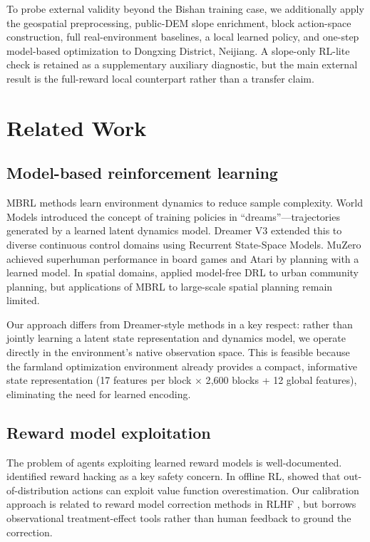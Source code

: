 \documentclass[11pt]{article}
\begin{document}
To probe external validity beyond the Bishan training case, we additionally apply the geospatial preprocessing, public-DEM slope enrichment, block action-space construction, full real-environment baselines, a local learned policy, and one-step model-based optimization to Dongxing District, Neijiang. A slope-only RL-lite check is retained as a supplementary auxiliary diagnostic, but the main external result is the full-reward local counterpart rather than a transfer claim.


\section{Related Work}
\label{sec:related}

\subsection{Model-based reinforcement learning}

MBRL methods learn environment dynamics to reduce sample complexity. World Models \citep{ha2018world} introduced the concept of training policies in ``dreams''---trajectories generated by a learned latent dynamics model. Dreamer V3 \citep{hafner2023dreamerv3} extended this to diverse continuous control domains using Recurrent State-Space Models. MuZero \citep{schrittwieser2020muzero} achieved superhuman performance in board games and Atari by planning with a learned model. In spatial domains, \citet{zheng2023spatial} applied model-free DRL to urban community planning, but applications of MBRL to large-scale spatial planning remain limited.

Our approach differs from Dreamer-style methods in a key respect: rather than jointly learning a latent state representation and dynamics model, we operate directly in the environment's native observation space. This is feasible because the farmland optimization environment already provides a compact, informative state representation (17 features per block $\times$ 2{,}600 blocks + 12 global features), eliminating the need for learned encoding.

\subsection{Reward model exploitation}

The problem of agents exploiting learned reward models is well-documented. \citet{amodei2016concrete} identified reward hacking as a key safety concern. In offline RL, \citet{levine2020offline} showed that out-of-distribution actions can exploit value function overestimation. Our calibration approach is related to reward model correction methods in RLHF \citep{bai2022training}, but borrows observational treatment-effect tools rather than human feedback to ground the correction.
\end{document}
